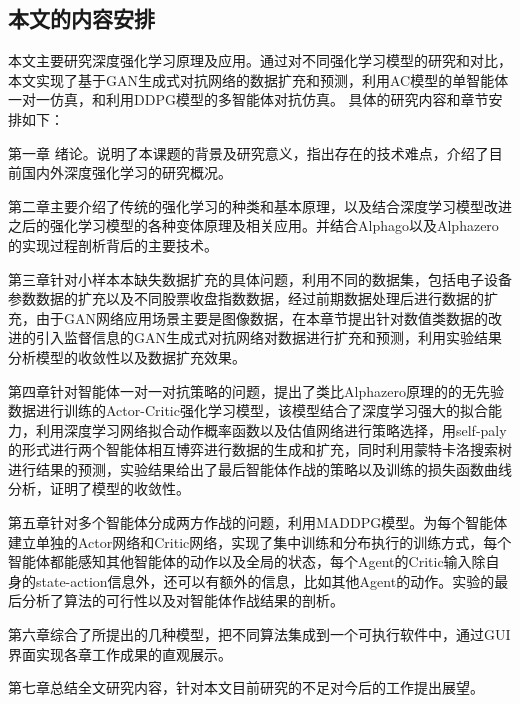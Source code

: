 \subsection{本文的内容安排}
本文主要研究深度强化学习原理及应用。通过对不同强化学习模型的研究和对比，本文实现了基于GAN生成式对抗网络的数据扩充和预测，利用AC模型的单智能体一对一仿真，和利用DDPG模型的多智能体对抗仿真。
具体的研究内容和章节安排如下：

第一章 绪论。说明了本课题的背景及研究意义，指出存在的技术难点，介绍了目前国内外深度强化学习的研究概况。

第二章主要介绍了传统的强化学习的种类和基本原理，以及结合深度学习模型改进之后的强化学习模型的各种变体原理及相关应用。并结合Alphago以及Alphazero的实现过程剖析背后的主要技术。

第三章针对小样本本缺失数据扩充的具体问题，利用不同的数据集，包括电子设备参数数据的扩充以及不同股票收盘指数数据，经过前期数据处理后进行数据的扩充，由于GAN网络应用场景主要是图像数据，在本章节提出针对数值类数据的改进的引入监督信息的GAN生成式对抗网络对数据进行扩充和预测，利用实验结果分析模型的收敛性以及数据扩充效果。

第四章针对智能体一对一对抗策略的问题，提出了类比Alphazero原理的的无先验数据进行训练的Actor-Critic强化学习模型，该模型结合了深度学习强大的拟合能力，利用深度学习网络拟合动作概率函数以及估值网络进行策略选择，用self-paly的形式进行两个智能体相互博弈进行数据的生成和扩充，同时利用蒙特卡洛搜索树进行结果的预测，实验结果给出了最后智能体作战的策略以及训练的损失函数曲线分析，证明了模型的收敛性。

第五章针对多个智能体分成两方作战的问题，利用MADDPG模型。为每个智能体建立单独的Actor网络和Critic网络，实现了集中训练和分布执行的训练方式，每个智能体都能感知其他智能体的动作以及全局的状态，每个Agent的Critic输入除自身的state-action信息外，还可以有额外的信息，比如其他Agent的动作。实验的最后分析了算法的可行性以及对智能体作战结果的剖析。

第六章综合了所提出的几种模型，把不同算法集成到一个可执行软件中，通过GUI界面实现各章工作成果的直观展示。

第七章总结全文研究内容，针对本文目前研究的不足对今后的工作提出展望。
